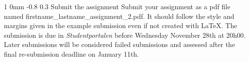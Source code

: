 \documentclass[11pt]{article}
\makeatletter
\newcommand{\newsec}[1]{\section{#1}\noindent}
\renewcommand{\section}{\@startsection
{section}%
{1}%
{0mm}%
{-0.8\baselineskip}%
{0.3\baselineskip}%
{\bfseries\large}}%
\makeatother
\begin{document}
\section{Submit the assignment}
\noindent
Submit your assignment as a pdf file named
firstname\_lastname\_assignment\_2.pdf. It should follow the style and
margins given in the example submission even if not created with
LaTeX. The submission is due in \emph{Studentportalen} before
Wednesday November 28th at 20h00. Later submissions will be considered
failed submissions and assessed after the final re-submission deadline
on January 11th.%



\end{document}
